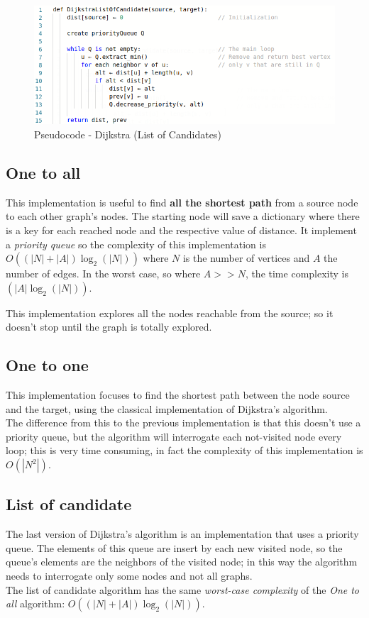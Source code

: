 \documentclass[a4paper,11pt]{report}
\begin{document}
\begin{figure}[h]
	\centering
	\includegraphics[width=\linewidth]{img/dijkstraLoC.png}
	\caption{Pseudocode - Dijkstra (List of Candidates)}
	\label{fig:dijkstraLoC}
\end{figure}

\subsection{One to all}
This implementation is useful to find \textbf{all the shortest path} from a source node to each other graph's nodes. The starting node will save a dictionary where there is a key for each reached node and the respective value of distance.
It implement a \textit{priority queue} so the complexity of this implementation is $O((|N|+|A|)\log_2(|N|))$ where $N$ is the number of vertices and $A$ the number of edges. In the worst case, so where $A>>N$, the time complexity is $(|A|\log_2(|N|))$.

This implementation explores all the nodes reachable from the source; so it doesn't stop until the graph is totally explored.

\subsection{One to one}
This implementation focuses to find the shortest path between the node source and the target, using the classical implementation of Dijkstra's algorithm.\\
The difference from this to the previous implementation is that this doesn't use a priority queue, but the algorithm will interrogate each not-visited node every loop; this is very time consuming, in fact the complexity of this implementation is $O(|N^2|)$.

\subsection{List of candidate}
The last version of Dijkstra's algorithm is an implementation that uses a priority queue. The elements of this queue are insert by each new visited node, so the queue's elements are the neighbors of the visited node; in this way the algorithm needs to interrogate only some nodes and not all graphs.\\
The list of candidate algorithm has the same \textit{worst-case complexity} of the \textit{One to all} algorithm: $O((|N|+|A|)\log_2(|N|))$.
\end{document}
